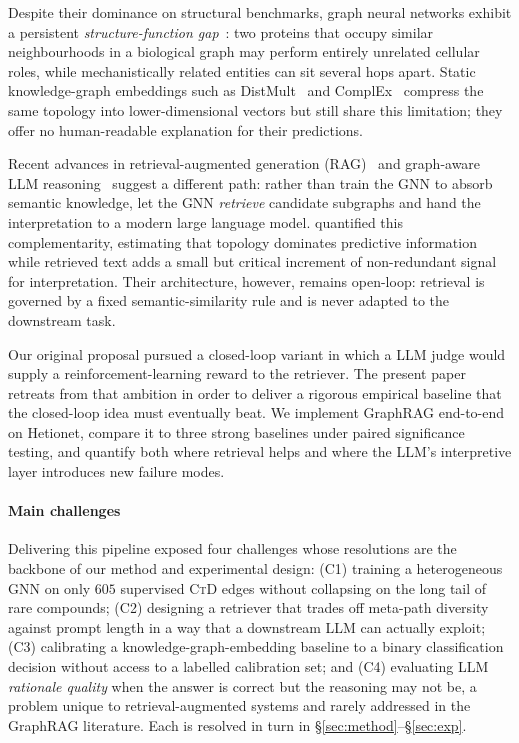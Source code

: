 \documentclass{article}
\newcommand{\ctd}{\textsc{CtD}\xspace}
\begin{document}
Despite their dominance on structural benchmarks, graph neural networks exhibit a persistent \emph{structure-function gap}~\citep{zitnik2018decagon}: two proteins that occupy similar neighbourhoods in a biological graph may perform entirely unrelated cellular roles, while mechanistically related entities can sit several hops apart. Static knowledge-graph embeddings such as DistMult~\citep{yang2015distmult} and ComplEx~\citep{trouillon2016complex} compress the same topology into lower-dimensional vectors but still share this limitation; they offer no human-readable explanation for their predictions.

Recent advances in retrieval-augmented generation (RAG)~\citep{lewis2020rag} and graph-aware LLM reasoning~\citep{mavromatis2024gnnrag,sun2024tog} suggest a different path: rather than train the GNN to absorb semantic knowledge, let the GNN \emph{retrieve} candidate subgraphs and hand the interpretation to a modern large language model. \citet{hays2026raggnn} quantified this complementarity, estimating that topology dominates predictive information while retrieved text adds a small but critical increment of non-redundant signal for interpretation. Their architecture, however, remains open-loop: retrieval is governed by a fixed semantic-similarity rule and is never adapted to the downstream task.

Our original proposal pursued a closed-loop variant in which a LLM judge would supply a reinforcement-learning reward to the retriever. The present paper retreats from that ambition in order to deliver a rigorous empirical baseline that the closed-loop idea must eventually beat. We implement GraphRAG end-to-end on Hetionet, compare it to three strong baselines under paired significance testing, and quantify both where retrieval helps and where the LLM's interpretive layer introduces new failure modes.

\paragraph{Main challenges}
Delivering this pipeline exposed four challenges whose resolutions are the backbone of our method and experimental design: (C1) training a heterogeneous GNN on only $605$ supervised \ctd edges without collapsing on the long tail of rare compounds; (C2) designing a retriever that trades off meta-path diversity against prompt length in a way that a downstream LLM can actually exploit; (C3) calibrating a knowledge-graph-embedding baseline to a binary classification decision without access to a labelled calibration set; and (C4) evaluating LLM \emph{rationale quality} when the answer is correct but the reasoning may not be, a problem unique to retrieval-augmented systems and rarely addressed in the GraphRAG literature. Each is resolved in turn in \S\ref{sec:method}--\S\ref{sec:exp}.
\end{document}
